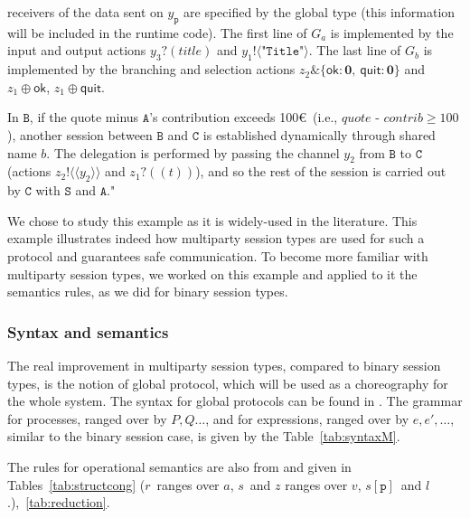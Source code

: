 \documentclass[a4paper,11pt,twoside]{report}
\newcommand{\ptilde}[1]{{\ensuremath{#1}}}
\newcommand{\Ia}{\ensuremath{a}}
\newcommand{\Ib}{\ensuremath{b}}
\newcommand{\y}{\ensuremath{y}}
\newcommand{\PP}{\ensuremath{P}}
\newcommand{\Q}{\ensuremath{Q}}
\newcommand{\si}[2]{\ensuremath{#1[#2]}}
\newcommand{\e}{\ensuremath{e}}
\newcommand{\participant}[1]{\ensuremath{\mathtt{#1}}}
\newcommand{\p}{\ensuremath{\participant{p}}}
\newcommand{\z}{\ensuremath{z}}
\newcommand{\s}{\ensuremath{s}}
\newcommand{\inact}{\ensuremath{\mathbf{0}}}
\newcommand{\va}{\ensuremath{v}}
\newcommand{\at}[1]{\ensuremath{\ptilde{#1}}}
\newcommand{\cas}{\ensuremath{r}}
\newcommand{\G}{\ensuremath{G}}
\begin{document}
receivers of the data sent on $\y_\p$ are specified by the global type (this information will be included in the runtime code). The
first line of $\G_\Ia$ is implemented by the input and output actions $y_3?(\textit{title})$ and $y_1!\langle \texttt{"Title"}
\rangle$. The last line of $\G_\Ib$ is implemented by the branching and selection actions $z_2\& \{\mathsf{ok}: \inact, \ \mathsf{quit}: \inact\}$ and $z_1\oplus \mathsf{ok}$, $z_1\oplus \mathsf{quit}$.

In \participant{B}, if the quote minus \participant{A}'s contribution exceeds 100\euro\ (i.e., $\textit{quote - contrib} \geq 100$), another session  between \participant{B} and \participant{C} is established dynamically through shared name $\Ib$. The delegation is performed by passing the channel $y_2$ from \participant{B} to \participant{C} (actions $\z_2!\langle\! \langle y_2 \rangle\!\rangle$ and $\z_1?(\! (t)\!)$), and so the rest of the session is carried out by \participant{C} with \participant{S} and \participant{A}." 

We chose to study this example as it is widely-used in the literature. This example illustrates indeed how multiparty session types are used for such a protocol and guarantees safe communication. To become more familiar with multiparty session types, we worked on this example and applied to it the semantics rules, as we did for binary session types.


\subsubsection{Syntax and semantics}
The real improvement in multiparty session types, compared to binary session types, is the notion of global protocol, which will be used as a choreography for the whole system. The syntax for global protocols can be found in \cite{coppoglobal}.
The grammar for processes, ranged over by $\PP, \Q\dots$, and for expressions, ranged over by $\e,\e',\dots$, similar to the binary session case, is given by the Table~\ref{tab:syntaxM}.

The rules for operational semantics are also from \cite{coppoglobal} and given in Tables~\ref{tab:structcong} (\cas\ ranges over \Ia, \s\ and $z$ ranges over
\at{\va}, \si\s\p\ and $l$.),~\ref{tab:reduction}.
\end{document}
